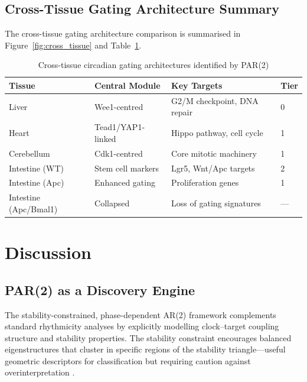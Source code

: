 \documentclass[11pt,letterpaper]{article}
\begin{document}
\subsection{Cross-Tissue Gating Architecture Summary}

The cross-tissue gating architecture comparison is summarised in Figure~\ref{fig:cross_tissue} and Table~\ref{tab:architectures}.

\begin{table}[H]
\centering
\caption{Cross-tissue circadian gating architectures identified by PAR(2)}
\label{tab:architectures}
\begin{tabular}{llll}
\toprule
\textbf{Tissue} & \textbf{Central Module} & \textbf{Key Targets} & \textbf{Tier} \\
\midrule
Liver & Wee1-centred & G2/M checkpoint, DNA repair & 0 \\
Heart & Tead1/YAP1-linked & Hippo pathway, cell cycle & 1 \\
Cerebellum & Cdk1-centred & Core mitotic machinery & 1 \\
Intestine (WT) & Stem cell markers & Lgr5, Wnt/Apc targets & 2 \\
Intestine (Apc) & Enhanced gating & Proliferation genes & 1 \\
Intestine (Apc/Bmal1) & Collapsed & Loss of gating signatures & --- \\
\bottomrule
\end{tabular}
\end{table}

\section{Discussion}

\subsection{PAR(2) as a Discovery Engine}

The stability-constrained, phase-dependent AR(2) framework complements standard rhythmicity analyses \citep{hughes2010jtk, cornelissen2014cosinor, thaben2014detecting} by explicitly modelling clock--target coupling structure and stability properties. The stability constraint encourages balanced eigenstructures that cluster in specific regions of the stability triangle---useful geometric descriptors for classification but requiring caution against overinterpretation \citep{strogatz2015nonlinear, alon2006introduction}.
\end{document}
